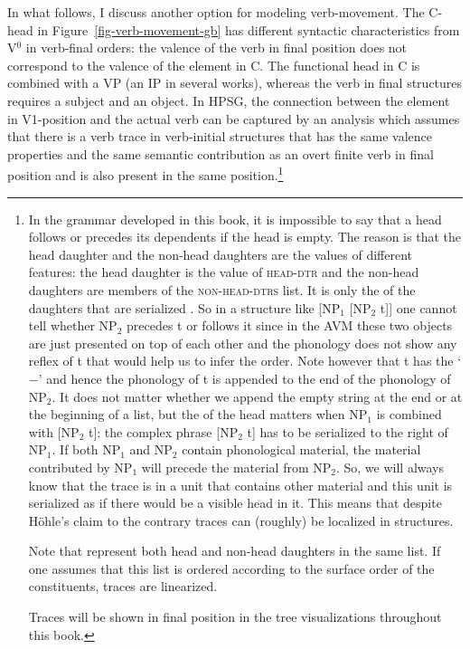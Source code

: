 In what follows, I discuss another option for modeling verb-movement.
The C-head in Figure~\ref{fig-verb-movement-gb} has different syntactic characteristics from
V$^0$ in verb-final orders: the valence of the verb in final position does not correspond to
the valence of the element in C. The functional head in C is combined with a VP (an IP in several
works), whereas the verb in final structures requires a subject and an object. 
In HPSG, the connection between the element in V1-position and the actual verb can be captured by an analysis which
assumes that there is a verb trace in verb-initial structures that has the same valence properties and the same semantic
contribution as an overt finite verb in final position and is also present in the same
position.\footnote{%
  In the grammar developed in this book, it is impossible to say that a head follows or precedes its
  dependents if the head is empty. The reason is that the head daughter and the non-head daughters
  are the values of different features: the head daughter is the value of \textsc{head-dtr} and the
  non-head daughters are members of the \textsc{non-head-dtrs} list. It is only the \phonvs of the
  daughters that are serialized \citep{Hoehle94a}. So in a structure like [NP$_1$ [NP$_2$ t]] one cannot tell whether
  NP$_2$ precedes t or follows it since in the AVM these two objects are just presented on top of each
  other and the phonology does not show any reflex of t that would help us to infer the order. Note
  however that t has the \initialv `$-$' and hence the phonology of t is appended to the end of the
  phonology of NP$_2$. It does not matter whether we append the empty string at the end or at the
  beginning of a list, but the \initialv of the head matters when NP$_1$ is combined with [NP$_2$ t]:
  the complex phrase [NP$_2$ t] has to be serialized to the right of NP$_1$. If both NP$_1$ and
  NP$_2$ contain phonological material, the material contributed by NP$_1$ will precede the material
  from NP$_2$. So, we will always know that the trace is in a unit that contains other material and
  this unit is serialized as if there would be a visible head in it. This means that despite Höhle's
  claim to the contrary traces can (roughly) be localized in structures.

  Note that \citet{GSag2000a-u} represent both head and non-head daughters in the same list. If one
  assumes that this list is ordered according to the surface order of the constituents, traces are
  linearized.

  Traces will be shown in final position in the tree visualizations throughout this book.
}
